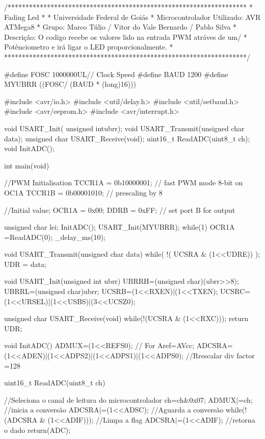 \begin{codigo}[caption = {Fading LED}, label={codigo:fading LED},language=C, breaklines=true]
 
  /*******************************************************************
 *      Fading Led
 *
 * Universidade Federal de Goiás
 * Microcontrolador Utilizado: AVR ATMega8
 * Grupo: Marco Túlio / Vitor do Vale Bernardo / Pablo Silva
 * Descrição: O codigo recebe os valores lido na entrada PWM atráves de um/
 *		   	  Potênciometro e irá ligar o LED proporcionalmente.
 * 
 ********************************************************************/

#define FOSC 1000000UL// Clock Speed
#define BAUD 1200
#define MYUBRR ((FOSC/ (BAUD * (long)16)))

#include <avr/io.h>
#include <util/delay.h>
#include <util/setbaud.h>
#include <avr/eeprom.h>
#include <avr/interrupt.h>

void USART_Init( unsigned intubrr);
void USART_Transmit(unsigned char data);
unsigned char USART_Receive(void);
uint16_t ReadADC(uint8_t ch);
void InitADC();


int main(void)
{
	
	//PWM Initialisation
	TCCR1A = 0b10000001; // fast PWM mode 8-bit on OC1A
	TCCR1B = 0b00001010; // prescaling by 8
	
	//Initial value;
	OCR1A = 0x00;
	DDRB = 0xFF; // set port B for output


	unsigned char lei;
	InitADC();
	USART_Init(MYUBRR);
	while(1)
	{
		OCR1A =ReadADC(0);
		_delay_ms(10);
	}
}

void USART_Transmit(unsigned char data)
{
	while( !( UCSRA & (1<<UDRE)) );
	UDR = data;
}


void USART_Init(unsigned int ubrr)
{
	UBRRH=(unsigned char)(ubrr>>8);
	UBRRL=(unsigned char)ubrr;
	UCSRB=(1<<RXEN)|(1<<TXEN);
	UCSRC=(1<<URSEL)|(1<<USBS)|(3<<UCSZ0);
}

unsigned char USART_Receive(void)
{
	while(!(UCSRA & (1<<RXC)));
	return UDR;
}


void InitADC()
{
	ADMUX=(1<<REFS0);             // For Aref=AVcc;
	ADCSRA=(1<<ADEN)|(1<<ADPS2)|(1<<ADPS1)|(1<<ADPS0); //Rrescalar div factor =128
}


uint16_t ReadADC(uint8_t ch)
{
	
	//Seleciona o canal de leitura do microcontrolador
	ch=ch&0x07;
	ADMUX|=ch;
	//inicia a conversão
	ADCSRA|=(1<<ADSC);
	//Aguarda a conversão
	while(!(ADCSRA & (1<<ADIF)));
	//Limpa a flag
	ADCSRA|=(1<<ADIF);
	//retorna o dado
	return(ADC);
}

\end{codigo}
